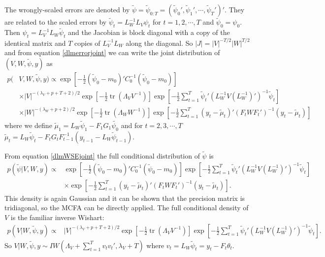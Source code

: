 \documentclass{article}
\DeclareMathOperator{\tr}{tr}
\begin{document}
The wrongly-scaled errors are denoted by $\tilde{\psi}=\tilde{\psi}_{0:T}=(\tilde{\psi}_0',\tilde{\psi}_1',\cdots,\tilde{\psi}_T')'$. They  are related to the scaled errors by $\tilde{\psi}_t=L_W^{-1}L_V\psi_t$ for $t=1,2,\cdots,T$ and $\tilde{\psi}_0=\psi_0$. Then $\psi_t = L_V^{-1}L_W\tilde{\psi}_t$ and the Jacobian is block diagonal with a copy of the identical matrix and $T$ copies of $L_V^{-1}L_W$ along the diagonal. So $|J|=|V|^{-T/2}|W|^{T/2}$ and from equation \eqref{dlmerrorjoint} we can write the joint distribution of $(V, W, \tilde{\psi}, y)$ as
\begin{align}
    p(&V,W,\tilde{\psi},y) \propto \exp\left[-\frac{1}{2}(\tilde{\psi}_0-m_0)'C_0^{-1}(\tilde{\psi}_0-m_0)\right] \nonumber\\
   &\times |V|^{-(\lambda_V + p + T + 2)/2}\exp\left[-\frac{1}{2}\tr\left(\Lambda_VV^{-1}\right)\right] \exp\left[-\frac{1}{2}\sum_{t=1}^T\tilde{\psi}_t'(L_W^{-1}V(L_W^{-1})')^{-1}\tilde{\psi}_t\right] \nonumber\\
    & \times |W|^{-(\lambda_W + p + 2)/2}\exp\left[-\frac{1}{2}\tr\left(\Lambda_WW^{-1}\right)\right]\exp\left[-\frac{1}{2}\sum_{t=1}^T(y_t - \tilde{\mu}_t)'(F_tWF_t')^{-1}(y_t-\tilde{\mu}_t)\right]\label{dlmWSEjoint}
 \end{align}
where we define $\tilde{\mu}_1 = L_W\tilde{\psi}_1 - F_1G_1\tilde{\psi_0}$ and for $t=2,3,\cdots,T$ $\tilde{\mu}_t =L_W\tilde{\psi}_t - F_tG_tF_{t-1}^{-1}(y_{t-1} - L_{W}\tilde{\psi}_{t-1})$.

From equation \eqref{dlmWSEjoint} the full conditional distribution of $\tilde{\psi}$ is
\begin{align*}
    p(\tilde{\psi}|V,W,y) \propto & \exp\left[-\frac{1}{2}(\tilde{\psi}_0-m_0)'C_0^{-1}(\tilde{\psi}_0-m_0)\right] \exp\left[-\frac{1}{2}\sum_{t=1}^T\tilde{\psi}_t'(L_W^{-1}V(L_W^{-1})')^{-1}\tilde{\psi}_t\right]\\
&\times  \exp\left[-\frac{1}{2}\sum_{t=1}^T(y_t - \tilde{\mu}_t)'(F_tWF_t')^{-1}(y_t-\tilde{\mu}_t)\right].
\end{align*}
This density is again Gaussian and it can be shown that the precision matrix is tridiagonal, so the MCFA can be directly applied. The full conditional density of $V$ is the familiar inverse Wishart:
\begin{align*}
    p(V|W,\tilde{\psi},y) \propto& |V|^{-(\lambda_V + p + T + 2)/2}\exp\left[-\frac{1}{2}\tr\left(\Lambda_VV^{-1}\right)\right] \exp\left[-\frac{1}{2}\sum_{t=1}^T\tilde{\psi}_t'(L_W^{-1}V(L_W^{-1})')^{-1}\tilde{\psi}_t\right]. 
 \end{align*}
So $V|W,\tilde{\psi},y \sim IW\left(\Lambda_V + \sum_{t=1}^Tv_tv_t', \lambda_V + T\right)$ where $v_t = L_W\tilde{\psi}_t = y_t - F_t\theta_t$.
\end{document}
